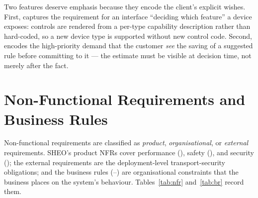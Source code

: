 Two features deserve emphasis because they encode the client's explicit wishes.
First,  captures the requirement for an interface ``deciding which
feature'' a device exposes: controls are rendered from a per-type capability
description rather than hard-coded, so a new device type is supported without new
control code. Second,  encodes the high-priority demand that the
customer \emph{see} the saving of a suggested rule before committing to it --- the
estimate must be visible at decision time, not merely after the fact.

\section{Non-Functional Requirements and Business Rules}
\label{sec:nfr}

Non-functional requirements are classified as \emph{product},
\emph{organisational}, or \emph{external} requirements. SHEO's product NFRs cover
performance (), safety (), and security (); the
external requirements are the deployment-level transport-security obligations; and the
business rules (--) are organisational constraints that the
business places on the system's behaviour. Tables~\ref{tab:nfr} and~\ref{tab:br}
record them.

